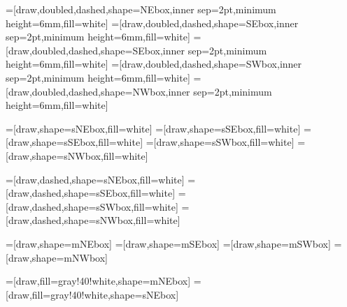 =[draw,doubled,dashed,shape=NEbox,inner sep=2pt,minimum height=6mm,fill=white]
=[draw,doubled,dashed,shape=SEbox,inner sep=2pt,minimum height=6mm,fill=white]
=[draw,doubled,dashed,shape=SEbox,inner sep=2pt,minimum height=6mm,fill=white]
=[draw,doubled,dashed,shape=SWbox,inner sep=2pt,minimum height=6mm,fill=white]
=[draw,doubled,dashed,shape=NWbox,inner sep=2pt,minimum height=6mm,fill=white]

=[draw,shape=sNEbox,fill=white]
=[draw,shape=sSEbox,fill=white]
=[draw,shape=sSEbox,fill=white]
=[draw,shape=sSWbox,fill=white]
=[draw,shape=sNWbox,fill=white]

=[draw,dashed,shape=sNEbox,fill=white]
=[draw,dashed,shape=sSEbox,fill=white]
=[draw,dashed,shape=sSWbox,fill=white]
=[draw,dashed,shape=sNWbox,fill=white]

=[draw,shape=mNEbox]
=[draw,shape=mSEbox]
=[draw,shape=mSWbox]
=[draw,shape=mNWbox]

=[draw,fill=gray!40!white,shape=mNEbox]
=[draw,fill=gray!40!white,shape=sNEbox]

\makeatletter


